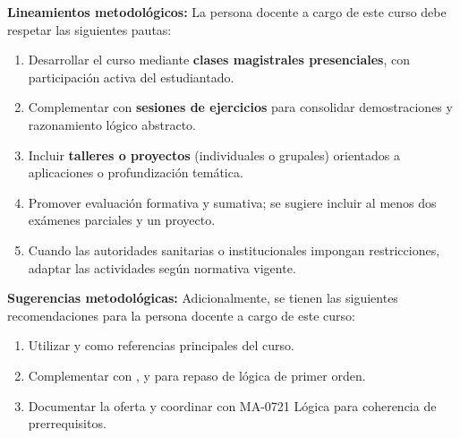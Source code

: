 \begin{refsection}
\noindent \textbf{Lineamientos metodológicos:} La persona docente a cargo de este curso debe respetar las siguientes pautas:

\begin{enumerate}
    \item Desarrollar el curso mediante \textbf{clases magistrales presenciales}, con participación activa del estudiantado.
    \item Complementar con \textbf{sesiones de ejercicios} para consolidar demostraciones y razonamiento lógico abstracto.
    \item Incluir \textbf{talleres o proyectos} (individuales o grupales) orientados a aplicaciones o profundización temática.
    \item Promover evaluación formativa y sumativa; se sugiere incluir al menos dos exámenes parciales y un proyecto.
    \item Cuando las autoridades sanitarias o institucionales impongan restricciones, adaptar las actividades según normativa vigente.
\end{enumerate}

\textbf{Sugerencias metodológicas:} Adicionalmente, se tienen las siguientes recomendaciones para la persona docente a cargo de este curso:

\begin{enumerate}
    \item Utilizar \cite{Mar02} y \cite{Poi00} como referencias principales del curso.
    \item Complementar con \cite{HiL19}, \cite{EFT94} y \cite{CL2000} para repaso de lógica de primer orden.
    \item Documentar la oferta y coordinar con MA-0721 Lógica para coherencia de prerrequisitos.
\end{enumerate}

\nocite{HiL19}
\nocite{CL2000}
\nocite{EFT94}
\nocite{Mar02}
\nocite{Poi00}

\printcursosbibliography
\end{refsection}

